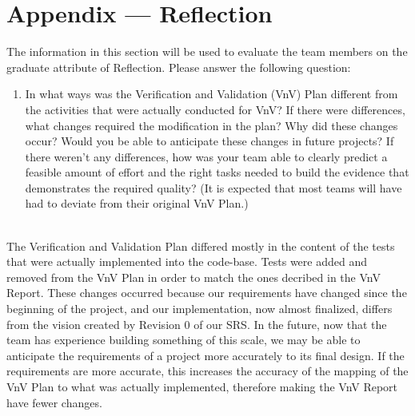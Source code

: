 \documentclass[12pt, titlepage]{article}
\begin{document}



\newpage{}
\section*{Appendix --- Reflection}

The information in this section will be used to evaluate the team members on the
graduate attribute of Reflection.  Please answer the following question:

\begin{enumerate}
  \item In what ways was the Verification and Validation (VnV) Plan different
  from the activities that were actually conducted for VnV?  If there were
  differences, what changes required the modification in the plan?  Why did
  these changes occur?  Would you be able to anticipate these changes in future
  projects?  If there weren't any differences, how was your team able to clearly
  predict a feasible amount of effort and the right tasks needed to build the
  evidence that demonstrates the required quality?  (It is expected that most
  teams will have had to deviate from their original VnV Plan.)
\end{enumerate}
\\
The Verification and Validation Plan differed mostly in the content of the tests that were actually implemented into the code-base. Tests were added and removed from the VnV Plan in order to match the ones decribed in the VnV Report. These changes occurred because our requirements have changed since the beginning of the project, and our implementation, now almost finalized, differs from the vision created by Revision 0 of our SRS. In the future, now that the team has experience building something of this scale, we may be able to anticipate the requirements of a project more accurately to its final design. If the requirements are more accurate, this increases the accuracy of the mapping of the VnV Plan to what was actually implemented, therefore making the VnV Report have fewer changes.

\newpage{}
\end{document}
